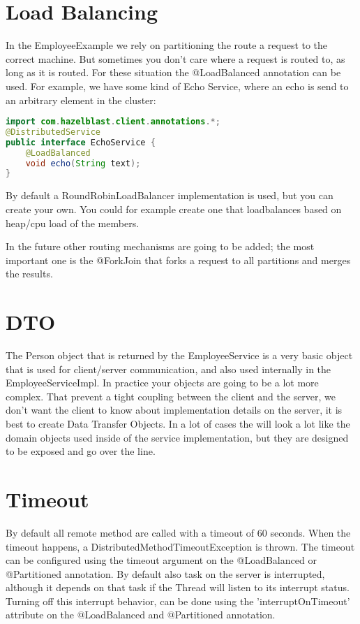 \section{Load Balancing}
In the EmployeeExample we rely on partitioning the route a request to the correct machine. But sometimes you don't care where a request is routed to, as long as it is routed. For these situation the @LoadBalanced annotation can be used. For example, we have some kind of Echo Service, where an echo is send to an arbitrary element in the cluster:
\begin{lstlisting}[language=java]
import com.hazelblast.client.annotations.*;
@DistributedService
public interface EchoService {
    @LoadBalanced
    void echo(String text);
}
\end{lstlisting}
By default a RoundRobinLoadBalancer implementation is used, but you can create your own. You could for example create one that loadbalances based on heap/cpu load of the members. 

In the future other routing mechanisms are going to be added; the most important one is the @ForkJoin that forks a request to all partitions and merges the results.

\section{DTO}
The Person object that is returned by the EmployeeService is a very basic object that is used for client/server communication, and also used internally in the EmployeeServiceImpl. In practice your objects are going to be a lot more complex. That prevent a tight coupling between the client and the server, we don't want the client to know about implementation details on the server, it is best to create Data Transfer Objects. In a lot of cases the will look a lot like the domain objects used inside of the service implementation, but they are designed to be exposed and go over the line. 

\section{Timeout}
By default all remote method are called with a timeout of 60 seconds. When the timeout happens, a DistributedMethodTimeoutException is thrown. The timeout can be configured using the timeout argument on the @LoadBalanced or @Partitioned annotation. By default also task on the server is interrupted, although it depends on that task if the Thread will listen to its interrupt status. Turning off this interrupt behavior, can be done using the 'interruptOnTimeout' attribute on the @LoadBalanced and @Partitioned annotation.

